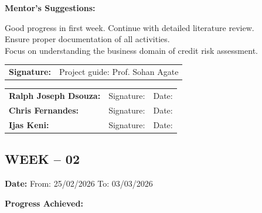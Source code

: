 \documentclass[12pt,a4paper]{article}
\begin{document}
\medskip

\noindent\textbf{Mentor's Suggestions:}

\medskip

\noindent Good progress in first week. Continue with detailed literature review. \\
Ensure proper documentation of all activities. \\
Focus on understanding the business domain of credit risk assessment.

\medskip

\noindent\begin{tabular}{p{4cm} p{6cm}}
\textbf{Signature:} & Project guide: Prof. Sohan Agate \\
\end{tabular}

\medskip

\noindent\begin{tabular}{p{3.5cm} p{5cm} p{3cm}}
\textbf{Ralph Joseph Dsouza:} & Signature: \underline{\hspace{4cm}} & Date: \underline{\hspace{2cm}} \\
\textbf{Chris Fernandes:} & Signature: \underline{\hspace{4cm}} & Date: \underline{\hspace{2cm}} \\
\textbf{Ijas Keni:} & Signature: \underline{\hspace{4cm}} & Date: \underline{\hspace{2cm}} \\
\end{tabular}

\newpage

\subsection*{WEEK – 02}
\vspace{0.3cm}

\textbf{Date:} From: 25/02/2026 To: 03/03/2026

\medskip

\noindent\textbf{Progress Achieved:}

\medskip
\end{document}
